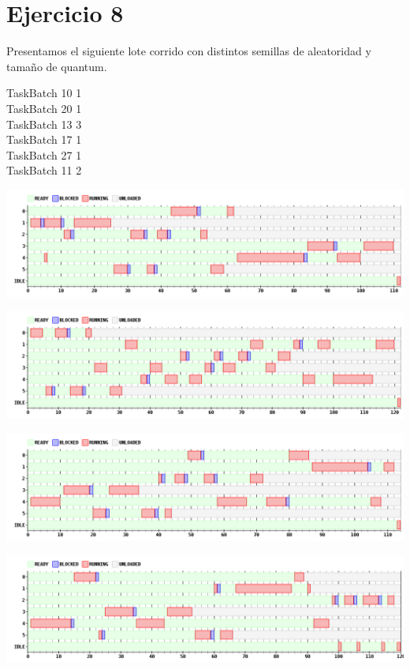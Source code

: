 \section{Ejercicio 8}

Presentamos el siguiente lote corrido con distintos semillas de aleatoridad y tamaño de quantum.

TaskBatch 10 1 \\
TaskBatch 20 1 \\
TaskBatch 13 3 \\
TaskBatch 17 1 \\
TaskBatch 27 1 \\
TaskBatch 11 2 \\

\begin {center}
\includegraphics[width=16cm]{../simusched/outputs/loterya.png}
\end {center}
\begin {center}
\includegraphics[width=16cm]{../simusched/outputs/loteryc.png}
\end {center}
\begin {center}
\includegraphics[width=16cm]{../simusched/outputs/loteryd.png}
\end {center}
\begin {center}
\includegraphics[width=16cm]{../simusched/outputs/loterye.png}
\end {center}
